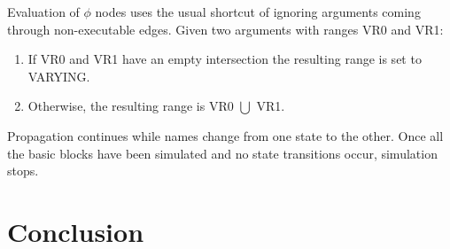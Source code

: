Evaluation of $\phi$ nodes uses the usual shortcut of ignoring
arguments coming through non-executable edges.  Given two
arguments with ranges VR0 and VR1:

\begin{enumerate}
\item	If VR0 and VR1 have an empty intersection the resulting
	range is set to VARYING.

\item	Otherwise, the resulting range is VR0 $\bigcup$ VR1.
\end{enumerate}

Propagation continues while names change from one state to the
other.  Once all the basic blocks have been simulated and no
state transitions occur, simulation stops.

\section{Conclusion}
\label{novillo:sec:conclusion}

